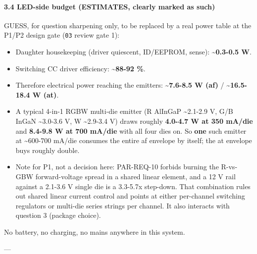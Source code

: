 \documentclass[11pt,a4paper]{article}
\begin{document}
\paragraph*{3.4 LED-side budget (ESTIMATES, clearly marked as such)}
GUESS, for question sharpening only, to be replaced by a real power table at the P1/P2 design gate (\texttt{03} review gate 1):

\begin{itemize}
\item Daughter housekeeping (driver quiescent, ID/EEPROM, sense): \textbf{\textasciitilde{}0.3-0.5 W}.
\item Switching CC driver efficiency: \textbf{\textasciitilde{}88-92 \%}.
\item Therefore electrical power reaching the emitters: \textbf{\textasciitilde{}7.6-8.5 W (af)} /
\textbf{\textasciitilde{}16.5-18.4 W (at)}.
\item A typical 4-in-1 RGBW multi-die emitter (R AlInGaP \textasciitilde{}2.1-2.9 V, G/B InGaN
\textasciitilde{}3.0-3.6 V, W \textasciitilde{}2.9-3.4 V) draws roughly \textbf{4.0-4.7 W at 350 mA/die} and
\textbf{8.4-9.8 W at 700 mA/die} with all four dies on. So \textbf{one} such emitter at
\textasciitilde{}600-700 mA/die consumes the entire af envelope by itself; the at envelope
buys roughly double.
\item Note for P1, not a decision here: PAR-REQ-10 forbids burning the R-vs-GBW
forward-voltage spread in a shared linear element, and a 12 V rail against a
2.1-3.6 V single die is a 3.3-5.7x step-down. That combination rules out
shared linear current control and points at either per-channel switching
regulators or multi-die series strings per channel. It also interacts with
question 3 (package choice).
\end{itemize}
No battery, no charging, no mains anywhere in this system.

---
\end{document}
